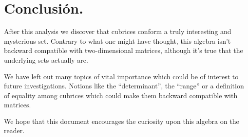 \section{Conclusión.}

After this analysis we discover that cubrices conform a truly interesting and mysterious set. Contrary to what one might have thought, this algebra isn't backward compatible with two-dimensional matrices, although it's true that the underlying sets actually are.

We have left out many topics of vital importance which could be of interest to future investigations. Notions like the ``determinant'', the ``range'' or a definition of equality among cubrices which could make them backward compatible with matrices.

We hope that this document encourages the curiosity upon this algebra on the reader.
